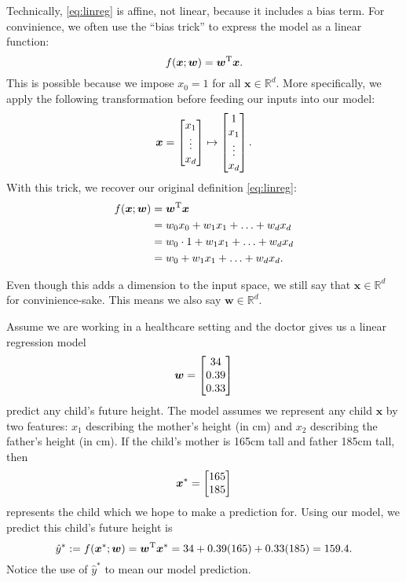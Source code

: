 Technically, \autoref{eq:linreg} is affine, not linear, because it includes a bias term. For convinience, we often use the ``bias trick'' to express the model as a linear function:
\begin{equation}
    \label{eq:bias trick}
    f(\bm x; \bm w) = \bm w^{\mathrm T} \bm x.
\end{equation}
This is possible because we impose $x_0 = 1$ for all $\bm x \in \mathbb R^d$. More specifically, we apply the following transformation before feeding our inputs into our model: $$\bm x = \begin{bmatrix}x_1\\\vdots\\x_d\end{bmatrix} \mapsto \begin{bmatrix}1\\x_1\\\vdots\\x_d\end{bmatrix}.$$ With this trick, we recover our original definition \autoref{eq:linreg}:
\begin{align*}
    f(\bm x; \bm w) &= \bm w^{\mathrm T} \bm x \\
    &= w_0 x_0 + w_1 x_1 + \ldots + w_d x_d \\
    &= w_0 \cdot 1 + w_1 x_1 + \ldots + w_d x_d \\
    &= w_0 + w_1 x_1 + \ldots + w_d x_d.
\end{align*}

\begin{warning}
    Even though this adds a dimension to the input space, we still say that $\bm x \in \mathbb R^d$ for convinience-sake. This means we also say $\bm w \in \mathbb R^d$.
\end{warning}

\begin{example}
    Assume we are working in a healthcare setting and the doctor gives us a linear regression model $$\bm w = \begin{bmatrix}34 \\ 0.39 \\ 0.33\end{bmatrix}$$ predict any child's future height. The model assumes we represent any child $\bm x$ by two features: $x_1$ describing the mother's height (in cm) and $x_2$ describing the father's height (in cm). If the child's mother is 165cm tall and father 185cm tall, then $$\bm x^* = \begin{bmatrix}165 \\ 185\end{bmatrix}$$ represents the child which we hope to make a prediction for. Using our model, we predict this child's future height is $$\hat y^* := f(\bm x^*; \bm w) = \bm w^{\mathrm T} \bm x^* = 34 + 0.39(165) + 0.33(185) = 159.4.$$ Notice the use of $\hat y^*$ to mean our model prediction.
\end{example}

